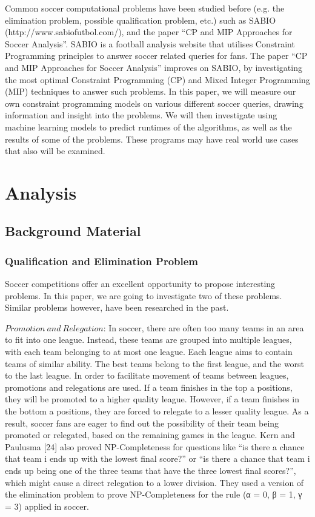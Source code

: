 \documentclass{article}
\begin{document}
	
	Common soccer computational problems have been studied before (e.g. the elimination problem, possible qualification problem, etc.) such as SABIO \\(http://www.sabiofutbol.com/), and the paper ``CP and MIP Approaches for Soccer Analysis''. SABIO is a football analysis website that utilises Constraint Programming principles to answer soccer related queries for fans. The paper ``CP and MIP Approaches for Soccer Analysis'' improves on SABIO, by investigating the most optimal Constraint Programming (CP) and Mixed Integer Programming (MIP) techniques to answer such problems. 
	In this paper, we will measure our own constraint programming models on various different soccer queries, drawing information and insight into the problems. We will then investigate using machine learning models to predict runtimes of the algorithms, as well as the results of some of the problems. These programs may have real world use cases that also will be examined.
	
	\newpage
	\section{Analysis}
	
	\subsection{Background Material}
	
	\subsubsection{Qualification and Elimination Problem}
	Soccer competitions offer an excellent opportunity to propose interesting problems. In this paper, we are going to investigate two of these problems. Similar problems however, have been researched in the past.
	
	\(Promotion\ and\ Relegation\): In soccer, there are often too many teams in an area to fit into one league. Instead, these teams are grouped into multiple leagues, with each team belonging to at most one league. Each league aims to contain teams of similar ability. The best teams belong to the first league, and the worst to the last league. In order to facilitate movement of teams between leagues, promotions and relegations are used. If a team finishes in the top a positions, they will be promoted to a higher quality league. However, if a team finishes in the bottom a positions, they are forced to relegate to a lesser quality league. As a result, soccer fans are eager to find out the possibility of their team being promoted or relegated, based on the remaining games in the league. Kern and Paulusma [24] also proved NP-Completeness for questions like “is there a chance that team i ends up with the lowest final score?” or “is there a chance that team i ends up being one of the three teams that have the three lowest final scores?”, which might cause a direct relegation to a lower division. They used a version of the elimination problem to prove NP-Completeness for the rule (α = 0, β = 1, γ = 3) applied in soccer.
	
\end{document}

